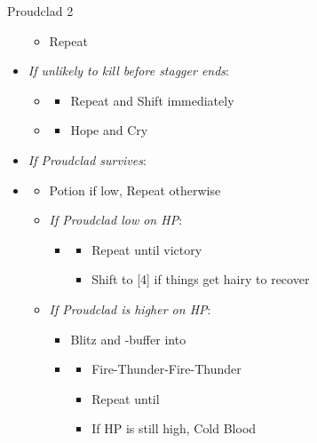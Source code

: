 \begin{battle}[2:01]{Proudclad 2}
\begin{multicols}{2}
\begin{itemize}
\begin{itemize}
				      \item Repeat
			      \end{itemize}
			      \columnbreak
			\item \textit{If unlikely to kill before stagger ends}:
			      \begin{itemize}
				      \item \first
				            \begin{itemize}
					            \item Repeat and Shift immediately
				            \end{itemize}
				      \item \second
				            \begin{itemize}
					            \item Hope and Cry
				            \end{itemize}
			      \end{itemize}
			\item \textit{If Proudclad survives}:
			\item \fourth
			      \begin{itemize}
				      \item Potion if low, Repeat otherwise
				      \item \textit{If Proudclad low on HP}:
				            \begin{itemize}
					            \item \second
					                  \begin{itemize}
						                  \item Repeat until victory
						                  \item Shift to [4] if things get hairy to recover
					                  \end{itemize}
				            \end{itemize}
				      \item \textit{If Proudclad is higher on HP}:
				            \begin{itemize}
					            \item Blitz and \rav-buffer into
					            \item \sixth
					                  \begin{itemize}
						                  \item Fire-Thunder-Fire-Thunder
						                  \item Repeat until \stagger
						                  \item If HP is still high, Cold Blood

\end{itemize}
\end{itemize}
\end{itemize}
\end{itemize}
\end{multicols}
\end{battle}
